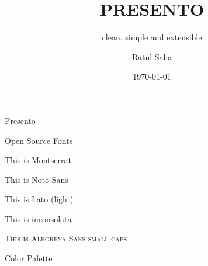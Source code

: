 \documentclass[14pt]{beamer}
\title{PRESENTO}
\subtitle{clean, simple and extensible}
\author{Ratul Saha}
\institute{www.ratulsaha.com}
\date{\today}
\begin{document}
\begin{frame}[plain]
\maketitle
\end{frame}

\begin{frame}{Presento}
    \begin{fullpageitemize}
        \item \begin{center}\end{center}
        \item \begin{center}\end{center}
        \item \begin{center}\end{center}
    \end{fullpageitemize}
\end{frame}

\begin{frame}{Open Source Fonts}
    \begin{fullpageitemize}
        \item {\montserratfont This is Montserrat}
        \item {\notosansfont This is Noto Sans}
        \item {\latolightfont This is Lato (light)}
        \item {\inconsolatafont This is inconsolata}
        \item \textsc{This is Alegreya Sans small caps}
    \end{fullpageitemize}
\end{frame}

\begin{frame}{Color Palette}
    \begin{center}
        \crule[colordgray] \crule[colorhgray] \crule[colorblue] \crule[colorgreen] \crule[colororange]
    \end{center}
\end{frame}


\end{document}
